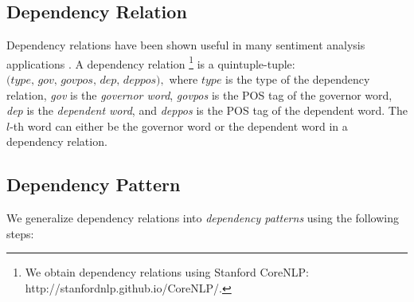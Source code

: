 \documentclass[11pt,a4paper]{article}
\theoremstyle{definition}
\begin{document}
\subsection{Dependency Relation}
Dependency relations have been shown useful in many sentiment analysis applications \cite{Johansson2010,Jakob2010}. A dependency relation \footnote{We obtain dependency relations using Stanford CoreNLP: http://stanfordnlp.github.io/CoreNLP/.} is a quintuple-tuple:  
$\textit{(type, gov, govpos, dep, deppos)},$
where $\textit{type}$ is the type of the dependency relation, \textit{gov} is the \emph{governor word}, \textit{govpos} is the POS tag of the governor word, \textit{dep} is the \emph{dependent word}, and \textit{deppos} is the POS tag of the dependent word. The $l$-th word can either be the governor word or the dependent word in a dependency relation. 






\subsection{Dependency Pattern}
We generalize dependency relations into {\em dependency patterns} using the following steps: 
\end{document}
